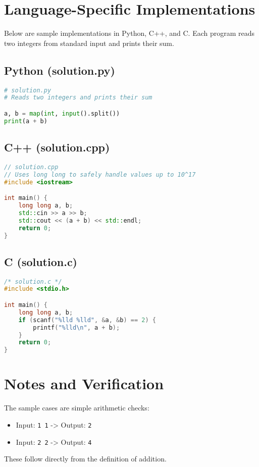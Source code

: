 \documentclass[11pt,a4paper]{article}
\begin{document}
\section*{Language-Specific Implementations}
Below are sample implementations in Python, C++, and C. Each program reads two integers from standard input and prints their sum.

\subsection*{Python (solution.py)}
\begin{lstlisting}[language=Python]
# solution.py
# Reads two integers and prints their sum

a, b = map(int, input().split())
print(a + b)
\end{lstlisting}

\subsection*{C++ (solution.cpp)}
\begin{lstlisting}[language=C++]
// solution.cpp
// Uses long long to safely handle values up to 10^17
#include <iostream>

int main() {
    long long a, b;
    std::cin >> a >> b;
    std::cout << (a + b) << std::endl;
    return 0;
}
\end{lstlisting}

\subsection*{C (solution.c)}
\begin{lstlisting}[language=C]
/* solution.c */
#include <stdio.h>

int main() {
    long long a, b;
    if (scanf("%lld %lld", &a, &b) == 2) {
        printf("%lld\n", a + b);
    }
    return 0;
}
\end{lstlisting}

\section*{Notes and Verification}
The sample cases are simple arithmetic checks:
\begin{itemize}[leftmargin=*]
  \item Input: \texttt{1 1} -> Output: \texttt{2}
  \item Input: \texttt{2 2} -> Output: \texttt{4}
\end{itemize}
These follow directly from the definition of addition.
\end{document}
